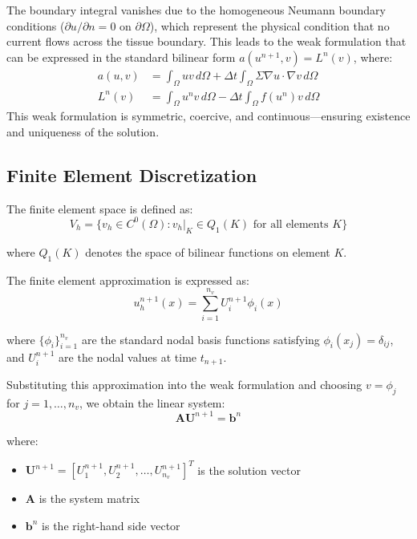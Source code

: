 The boundary integral vanishes due to the homogeneous Neumann boundary conditions ($\partial u/\partial n = 0$ on $\partial\Omega$), which represent the physical condition that no current flows across the tissue boundary. This leads to the weak formulation that can be expressed in the standard bilinear form $a(u^{n+1}, v) = L^n(v)$, where:
\begin{align}
a(u, v) &= \int_\Omega uv \, d\Omega + \Delta t \int_\Omega \Sigma \nabla u \cdot \nabla v \, d\Omega \\
L^n(v) &= \int_\Omega u^n v \, d\Omega - \Delta t \int_\Omega f(u^n) v \, d\Omega
\end{align}
This weak formulation is symmetric, coercive, and continuous—ensuring existence and uniqueness of the solution.

\subsection{Finite Element Discretization}

The finite element space is defined as:
\begin{equation}
V_h = \{v_h \in C^0(\Omega) : v_h|_K \in Q_1(K) \text{ for all elements } K\}
\end{equation}

where $Q_1(K)$ denotes the space of bilinear functions on element $K$.

The finite element approximation is expressed as:
\begin{equation}
u_h^{n+1}(x) = \sum_{i=1}^{n_v} U_i^{n+1} \phi_i(x)
\end{equation}

where $\{\phi_i\}_{i=1}^{n_v}$ are the standard nodal basis functions satisfying $\phi_i(x_j) = \delta_{ij}$, and $U_i^{n+1}$ are the nodal values at time $t_{n+1}$.

Substituting this approximation into the weak formulation and choosing $v = \phi_j$ for $j = 1, \ldots, n_v$, we obtain the linear system:
\begin{equation}
\mathbf{A} \mathbf{U}^{n+1} = \mathbf{b}^n
\end{equation}

where:
\begin{itemize}
\item $\mathbf{U}^{n+1} = [U_1^{n+1}, U_2^{n+1}, \ldots, U_{n_v}^{n+1}]^T$ is the solution vector
\item $\mathbf{A}$ is the system matrix
\item $\mathbf{b}^n$ is the right-hand side vector
\end{itemize}

